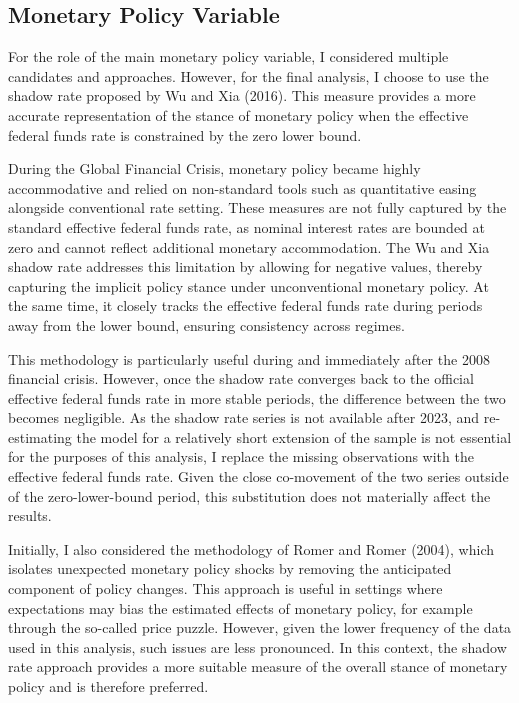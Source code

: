 \documentclass[12pt,a4paper]{report}\usepackage[a4paper, top=2.5cm, bottom=2.5cm, left=2.5cm, right=2.5cm]{geometry}
\begin{document}
\subsection{Monetary Policy Variable}
For the role of the main monetary policy variable, I considered multiple candidates and approaches.
However, for the final analysis, I choose to use the shadow rate proposed by Wu and Xia (2016).
This measure provides a more accurate representation of the stance of monetary policy when the
effective federal funds rate is constrained by the zero lower bound.

During the Global Financial Crisis, monetary policy became highly accommodative and relied on
non-standard tools such as quantitative easing alongside conventional rate setting. These measures
are not fully captured by the standard effective federal funds rate, as nominal interest rates are
bounded at zero and cannot reflect additional monetary accommodation. The Wu and Xia shadow rate
addresses this limitation by allowing for negative values, thereby capturing the implicit policy
stance under unconventional monetary policy. At the same time, it closely tracks the effective
federal funds rate during periods away from the lower bound, ensuring consistency across regimes.

This methodology is particularly useful during and immediately after the 2008 financial crisis.
However, once the shadow rate converges back to the official effective federal funds rate in more
stable periods, the difference between the two becomes negligible. As the shadow rate series is not
available after 2023, and re-estimating the model for a relatively short extension of the sample is
not essential for the purposes of this analysis, I replace the missing observations with the
effective federal funds rate. Given the close co-movement of the two series outside of the
zero-lower-bound period, this substitution does not materially affect the results.

Initially, I also considered the methodology of Romer and Romer (2004), which isolates unexpected
monetary policy shocks by removing the anticipated component of policy changes. This approach is
useful in settings where expectations may bias the estimated effects of monetary policy, for
example through the so-called price puzzle. However, given the lower frequency of the data used in
this analysis, such issues are less pronounced. In this context, the shadow rate approach provides a
more suitable measure of the overall stance of monetary policy and is therefore preferred.
\end{document}
